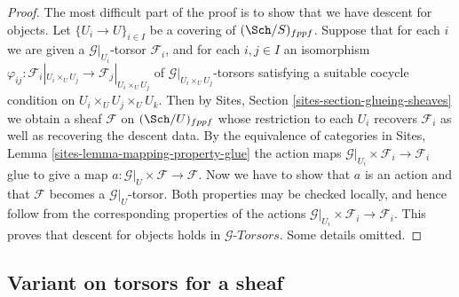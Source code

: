\begin{proof}
The most difficult part of the proof is to show that
we have descent for objects.
Let $\{U_i \to U\}_{i \in I}$ be a covering of $(\Sch/S)_{fppf}$.
Suppose that for each $i$ we are given a $\mathcal{G}|_{U_i}$-torsor
$\mathcal{F}_i$, and for each $i, j \in I$ an isomorphism
$\varphi_{ij} :
\mathcal{F}_i|_{U_i \times_U U_j} \to \mathcal{F}_j|_{U_i \times_U U_j}$
of $\mathcal{G}|_{U_i \times_U U_j}$-torsors
satisfying a suitable cocycle condition on $U_i \times_U U_j \times_U U_k$.
Then by
Sites, Section \ref{sites-section-glueing-sheaves}
we obtain a sheaf $\mathcal{F}$ on $(\Sch/U)_{fppf}$
whose restriction to each $U_i$ recovers $\mathcal{F}_i$ as well
as recovering the descent data. By the equivalence of categories in
Sites, Lemma \ref{sites-lemma-mapping-property-glue}
the action maps $\mathcal{G}|_{U_i} \times \mathcal{F}_i \to \mathcal{F}_i$
glue to give a map $a : \mathcal{G}|_U \times \mathcal{F} \to \mathcal{F}$.
Now we have to show that $a$ is an action and that $\mathcal{F}$ becomes
a $\mathcal{G}|_U$-torsor. Both properties may be checked locally, and
hence follow from the corresponding properties of the actions
$\mathcal{G}|_{U_i} \times \mathcal{F}_i \to \mathcal{F}_i$.
This proves that descent for objects holds in
$\mathcal{G}\textit{-Torsors}$.
Some details omitted.
\end{proof}



\subsection{Variant on torsors for a sheaf}
\label{subsection-variant-torsor-sheaf}

